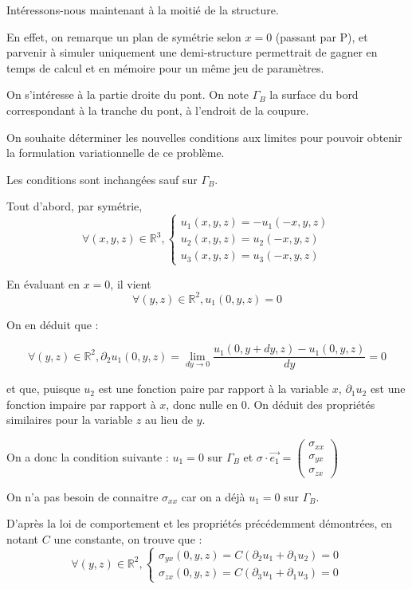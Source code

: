 

Intéressons-nous maintenant à la moitié de la structure. 

En effet, on remarque un plan de symétrie selon $x=0$ (passant par P), et parvenir à simuler uniquement une demi-structure permettrait de gagner en temps de calcul et en mémoire pour un même jeu de paramètres.

On s'intéresse à la partie droite du pont. On note $\Gamma_B$ la surface du bord correspondant à la tranche du pont, à l'endroit de la coupure.

On souhaite déterminer les nouvelles conditions aux limites pour pouvoir obtenir la formulation variationnelle de ce problème.

Les conditions sont inchangées sauf sur $\Gamma_B$.

Tout d'abord, par symétrie, 
$$\forall (x,y,z) \in \mathbb{R}^3,
\begin{cases}
 u_1(x,y,z) = - u_1(-x,y,z)\\
 u_2(x,y,z) = u_2(-x,y,z)\\
 u_3(x,y,z) = u_3(-x,y,z)
\end{cases}
$$

En évaluant en $x=0$, il vient
$$\forall (y,z) \in \mathbb{R}^2, u_1(0,y,z) = 0$$

On en déduit que :

$$\forall (y,z) \in \mathbb{R}^2, \partial_2 u_1 (0, y, z) = \lim_{dy\rightarrow 0} \frac{u_1(0,y+dy,z)-u_1(0,y,z)}{dy}=0$$

et que, puisque $u_2$ est une fonction paire par rapport à la variable $x$, $\partial_1 u_2$ est une fonction impaire par rapport à $x$, donc nulle en $0$. On déduit des propriétés similaires pour la variable $z$ au lieu de $y$.

On a donc la condition suivante : $u_1 = 0$ sur $\Gamma_B$ et $\sigma \cdot \vec{e_1}=
\begin{pmatrix}
    \sigma_{xx}\\
    \sigma_{yx}\\
    \sigma_{zx}
\end{pmatrix}$

On n'a pas besoin de connaitre $\sigma_{xx}$ car on a déjà $u_1 = 0$ sur $\Gamma_B$. 

D'après la loi de comportement et les propriétés précédemment démontrées, en notant $C$ une constante, on trouve que :
 $$
 \forall (y,z) \in \mathbb{R}^2,
 \begin{cases}
    \sigma_{yx}(0, y, z) = C (\partial_2 u_1 + \partial_1 u_2) = 0\\
    \sigma_{zx}(0, y, z) = C (\partial_3 u_1 + \partial_1 u_3) = 0
 \end{cases}
$$

